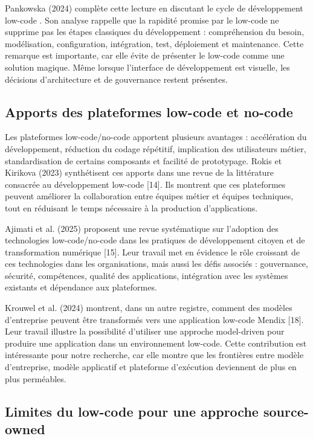 Pankowska (2024) complète cette lecture en discutant le cycle de développement low-code \cite{pankowska2024}. Son analyse rappelle que la rapidité promise par le low-code ne supprime pas les étapes classiques du développement : compréhension du besoin, modélisation, configuration, intégration, test, déploiement et maintenance. Cette remarque est importante, car elle évite de présenter le low-code comme une solution magique. Même lorsque l'interface de développement est visuelle, les décisions d'architecture et de gouvernance restent présentes.

\subsection{Apports des plateformes low-code et no-code}

Les plateformes low-code/no-code apportent plusieurs avantages : accélération du développement, réduction du codage répétitif, implication des utilisateurs métier, standardisation de certains composants et facilité de prototypage. Rokis et Kirikova (2023) synthétisent ces apports dans une revue de la littérature consacrée au développement low-code [14]. Ils montrent que ces plateformes peuvent améliorer la collaboration entre équipes métier et équipes techniques, tout en réduisant le temps nécessaire à la production d'applications.

Ajimati et al. (2025) proposent une revue systématique sur l'adoption des technologies low-code/no-code dans les pratiques de développement citoyen et de transformation numérique [15]. Leur travail met en évidence le rôle croissant de ces technologies dans les organisations, mais aussi les défis associés : gouvernance, sécurité, compétences, qualité des applications, intégration avec les systèmes existants et dépendance aux plateformes.

Krouwel et al. (2024) montrent, dans un autre registre, comment des modèles d'entreprise peuvent être transformés vers une application low-code Mendix [18]. Leur travail illustre la possibilité d'utiliser une approche model-driven pour produire une application dans un environnement low-code. Cette contribution est intéressante pour notre recherche, car elle montre que les frontières entre modèle d'entreprise, modèle applicatif et plateforme d'exécution deviennent de plus en plus perméables.

\subsection{Limites du low-code pour une approche source-owned}

